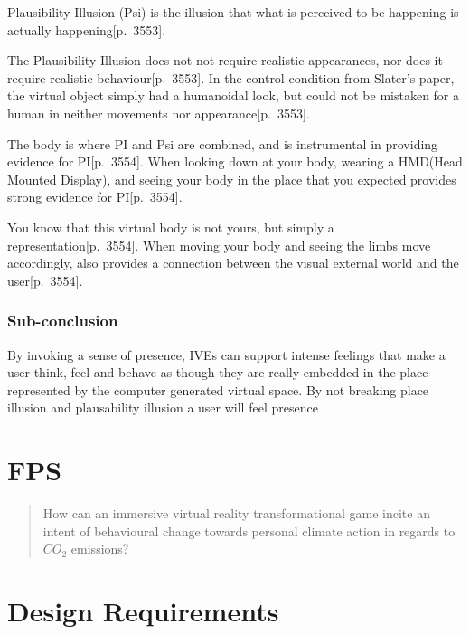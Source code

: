     Plausibility Illusion (Psi) is the illusion that what is perceived to be happening is actually happening\citep{vrImmersion}[p.~3553].
    
    The Plausibility Illusion does not not require realistic appearances, nor does it require realistic behaviour\citep{vrImmersion}[p.~3553]. In the control condition from Slater's paper, the virtual object simply had a humanoidal look, but could not be mistaken for a human in neither movements nor appearance\citep{vrImmersion}[p.~3553].
    
    The body is where PI and Psi are combined, and is instrumental in providing evidence for PI\citep{vrImmersion}[p.~3554]. When looking down at your body, wearing a HMD(Head Mounted Display), and seeing your body in the place that you expected provides strong evidence for PI\citep{vrImmersion}[p.~3554].
    
    You know that this virtual body is not yours, but simply a representation\citep{vrImmersion}[p.~3554]. When moving your body and seeing the limbs move accordingly, also provides a connection between the visual external world and the user\citep{vrImmersion}[p.~3554].
    
    \subsubsection{Sub-conclusion}
    By invoking a sense of presence, IVEs can support intense feelings that make a user think, feel and behave as though they are really embedded in the place represented by the computer generated virtual space.
    By not breaking place illusion and plausability illusion a user will feel presence
    
    


\section{FPS}\label{sec:FPS}
\begin{quote}
    How can an immersive virtual reality transformational game incite an intent of behavioural change towards personal climate action in regards to $CO_{2}$ emissions? 
\end{quote}

\section{Design Requirements}\label{designReq}


